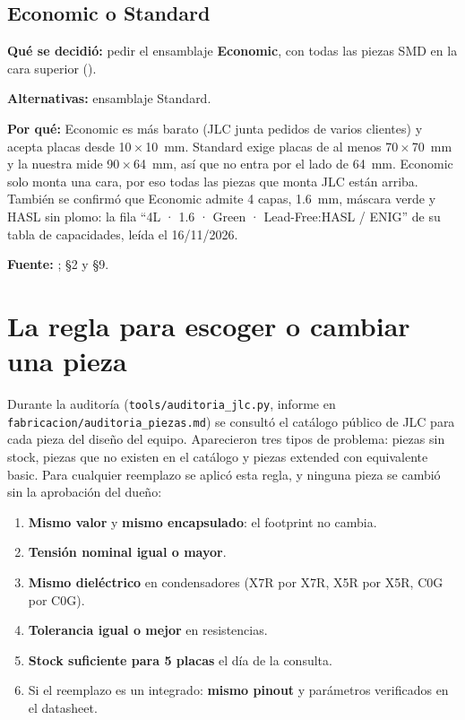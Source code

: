 \subsection{Economic o Standard}

\begin{decision}
\textbf{Qué se decidió:} pedir el ensamblaje \textbf{Economic}, con todas las piezas SMD en la cara superior ().

\textbf{Alternativas:} ensamblaje Standard.

\textbf{Por qué:} Economic es más barato (JLC junta pedidos de varios clientes) y acepta placas desde \num{10}\,$\times$\,\SI{10}{\milli\meter}. Standard exige placas de al menos \num{70}\,$\times$\,\SI{70}{\milli\meter} y la nuestra mide \num{90}\,$\times$\,\SI{64}{\milli\meter}, así que no entra por el lado de \SI{64}{\milli\meter}. Economic solo monta una cara, por eso todas las piezas que monta JLC están arriba. También se confirmó que Economic admite 4 capas, \SI{1.6}{\milli\meter}, máscara verde y HASL sin plomo: la fila ``4L · 1.6 · Green · Lead-Free:HASL / ENIG'' de su tabla de capacidades, leída el 16/11/2026.

\textbf{Fuente:} ;  §2 y §9.
\end{decision}

\section{La regla para escoger o cambiar una pieza}\label{sec:c05-regla}

Durante la auditoría (\nolinkurl{tools/auditoria_jlc.py}, informe en \nolinkurl{fabricacion/auditoria_piezas.md}) se consultó el catálogo público de JLC para cada pieza del diseño del equipo. Aparecieron tres tipos de problema: piezas sin stock, piezas que no existen en el catálogo y piezas extended con equivalente basic. Para cualquier reemplazo se aplicó esta regla, y ninguna pieza se cambió sin la aprobación del dueño:

\begin{enumerate}
  \item \textbf{Mismo valor} y \textbf{mismo encapsulado}: el footprint no cambia.
  \item \textbf{Tensión nominal igual o mayor}.
  \item \textbf{Mismo dieléctrico} en condensadores (X7R por X7R, X5R por X5R, C0G por C0G).
  \item \textbf{Tolerancia igual o mejor} en resistencias.
  \item \textbf{Stock suficiente para 5 placas} el día de la consulta.
  \item Si el reemplazo es un integrado: \textbf{mismo pinout} y parámetros verificados en el datasheet.
\end{enumerate}

